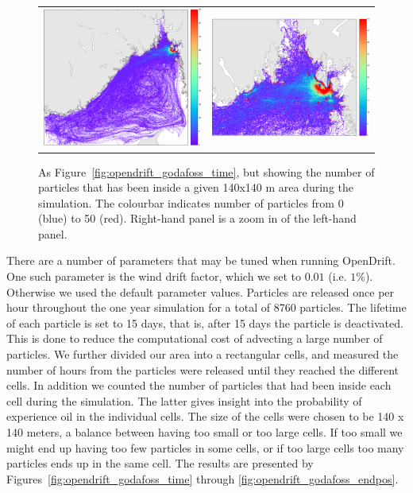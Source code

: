 \begin{figure}[htb]
  \begin{center}
    \begin{tabular}{cc}
      \includegraphics*[width=7.2cm]{Figurer/opendrift/opendrift_godafoss_consentration_crop}  & \includegraphics*[width=7.2cm]{Figurer/opendrift/opendrift_godafoss_consentration_zoom_crop}\\ 
    \end{tabular}
    \caption{\small As Figure~\ref{fig:opendrift_godafoss_time}, but showing the number of particles that has been inside a given 140x140 m area during the simulation. The colourbar indicates number of particles from 0 (blue) to 50 (red). Right-hand panel is a zoom in of the left-hand panel.}
    \label{fig:opendrift_godafoss_conc}
  \end{center}
\end{figure}

There are a number of parameters that may be tuned when running OpenDrift. One such parameter is the wind drift factor, which we set to $0.01$ (i.e. $1\%$). Otherwise we used the default parameter values. Particles are released once per hour throughout the one year simulation for a total of 8760 particles. The lifetime of each particle is set to 15 days, that is, after 15 days the particle is deactivated. This is done to reduce the computational cost of advecting a large number of particles. We further divided our area into a rectangular cells, and measured the number of hours from the particles were released until they reached the different cells. In addition we counted the number of particles that had been inside each cell during the simulation. The latter gives insight into the probability of experience oil in the individual cells. The size of the cells were chosen to be 140 x 140 meters, a balance between having too small or too large cells. If too small we might end up having too few particles in some cells, or if too large cells too many particles ends up in the same cell. The results are presented by Figures~\ref{fig:opendrift_godafoss_time} through \ref{fig:opendrift_godafoss_endpos}.

